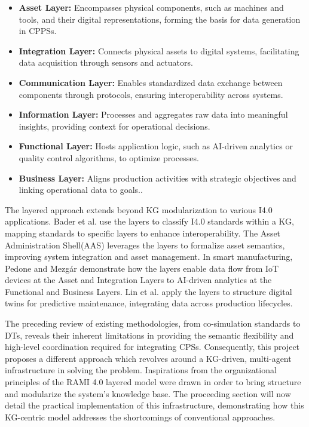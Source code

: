 \documentclass{article} %
\begin{document}
\begin{itemize}
  \item \textbf{Asset Layer:} Encompasses physical components, such as machines and tools, and their digital representations, forming the basis for data generation in CPPSs.
  
  \item \textbf{Integration Layer:} Connects physical assets to digital systems, facilitating data acquisition through sensors and actuators.
  
  \item \textbf{Communication Layer:} Enables standardized data exchange between components through protocols, ensuring interoperability across systems.
  
  \item \textbf{Information Layer:} Processes and aggregates raw data into meaningful insights, providing context for operational decisions.
  
  \item \textbf{Functional Layer:} Hosts application logic, such as AI-driven analytics or quality control algorithms, to optimize processes.
  
  \item \textbf{Business Layer:} Aligns production activities with strategic objectives and linking operational data to goals.\cite{bachhofner2021modularization, din2016rami}.
\end{itemize}

The layered approach extends beyond KG modularization to various I4.0 applications. Bader et al.\cite{bader2020knowledge} use the layers to classify I4.0 standards within a KG, mapping standards to specific layers to enhance interoperability. The Asset Administration Shell(AAS) leverages the layers to formalize asset semantics, improving system integration and asset management\cite{bader2019semantic}. In smart manufacturing, Pedone and Mezgár\cite{pedone2021interoperability} demonstrate how the layers enable data flow from IoT devices at the Asset and Integration Layers to AI-driven analytics at the Functional and Business Layers. Lin et al.\cite{lin2022digital} apply the layers to structure digital twins for predictive maintenance, integrating data across production lifecycles.

The preceding review of existing methodologies, from co-simulation standards to DTs, reveals their inherent limitations in providing the semantic flexibility and high-level coordination required for integrating CPSs. Consequently, this project proposes a different approach which revolves around a KG-driven, multi-agent infrastructure in solving the problem. Inspirations from the organizational principles of the RAMI 4.0 layered model were drawn in order to bring structure and modularize the system's knowledge base. The proceeding section will now detail the practical implementation of this infrastructure, demonstrating how this KG-centric model addresses the shortcomings of conventional approaches.
\end{document}
